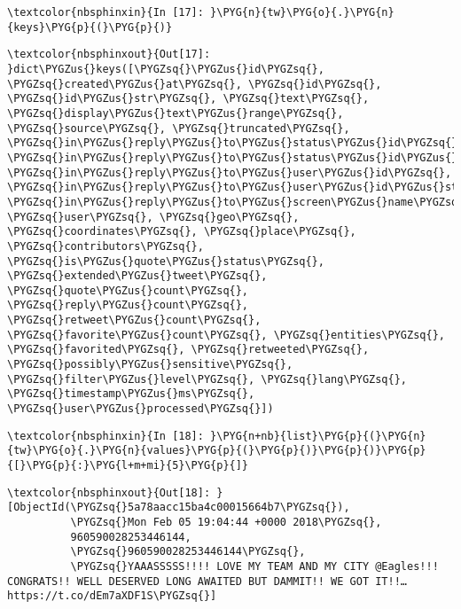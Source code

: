 \documentclass[letterpaper,10pt,english]{sphinxmanual}
\begin{document}
%
\begin{Verbatim}[commandchars=\\\{\}]
\textcolor{nbsphinxin}{In [17]: }\PYG{n}{tw}\PYG{o}{.}\PYG{n}{keys}\PYG{p}{(}\PYG{p}{)}
\end{Verbatim}

%
\begin{Verbatim}[commandchars=\\\{\}]
\textcolor{nbsphinxout}{Out[17]: }dict\PYGZus{}keys([\PYGZsq{}\PYGZus{}id\PYGZsq{}, \PYGZsq{}created\PYGZus{}at\PYGZsq{}, \PYGZsq{}id\PYGZsq{}, \PYGZsq{}id\PYGZus{}str\PYGZsq{}, \PYGZsq{}text\PYGZsq{}, \PYGZsq{}display\PYGZus{}text\PYGZus{}range\PYGZsq{}, \PYGZsq{}source\PYGZsq{}, \PYGZsq{}truncated\PYGZsq{}, \PYGZsq{}in\PYGZus{}reply\PYGZus{}to\PYGZus{}status\PYGZus{}id\PYGZsq{}, \PYGZsq{}in\PYGZus{}reply\PYGZus{}to\PYGZus{}status\PYGZus{}id\PYGZus{}str\PYGZsq{}, \PYGZsq{}in\PYGZus{}reply\PYGZus{}to\PYGZus{}user\PYGZus{}id\PYGZsq{}, \PYGZsq{}in\PYGZus{}reply\PYGZus{}to\PYGZus{}user\PYGZus{}id\PYGZus{}str\PYGZsq{}, \PYGZsq{}in\PYGZus{}reply\PYGZus{}to\PYGZus{}screen\PYGZus{}name\PYGZsq{}, \PYGZsq{}user\PYGZsq{}, \PYGZsq{}geo\PYGZsq{}, \PYGZsq{}coordinates\PYGZsq{}, \PYGZsq{}place\PYGZsq{}, \PYGZsq{}contributors\PYGZsq{}, \PYGZsq{}is\PYGZus{}quote\PYGZus{}status\PYGZsq{}, \PYGZsq{}extended\PYGZus{}tweet\PYGZsq{}, \PYGZsq{}quote\PYGZus{}count\PYGZsq{}, \PYGZsq{}reply\PYGZus{}count\PYGZsq{}, \PYGZsq{}retweet\PYGZus{}count\PYGZsq{}, \PYGZsq{}favorite\PYGZus{}count\PYGZsq{}, \PYGZsq{}entities\PYGZsq{}, \PYGZsq{}favorited\PYGZsq{}, \PYGZsq{}retweeted\PYGZsq{}, \PYGZsq{}possibly\PYGZus{}sensitive\PYGZsq{}, \PYGZsq{}filter\PYGZus{}level\PYGZsq{}, \PYGZsq{}lang\PYGZsq{}, \PYGZsq{}timestamp\PYGZus{}ms\PYGZsq{}, \PYGZsq{}user\PYGZus{}processed\PYGZsq{}])
\end{Verbatim}

%
\begin{Verbatim}[commandchars=\\\{\}]
\textcolor{nbsphinxin}{In [18]: }\PYG{n+nb}{list}\PYG{p}{(}\PYG{n}{tw}\PYG{o}{.}\PYG{n}{values}\PYG{p}{(}\PYG{p}{)}\PYG{p}{)}\PYG{p}{[}\PYG{p}{:}\PYG{l+m+mi}{5}\PYG{p}{]}
\end{Verbatim}

%
\begin{Verbatim}[commandchars=\\\{\}]
\textcolor{nbsphinxout}{Out[18]: }[ObjectId(\PYGZsq{}5a78aacc15ba4c00015664b7\PYGZsq{}),
          \PYGZsq{}Mon Feb 05 19:04:44 +0000 2018\PYGZsq{},
          960590028253446144,
          \PYGZsq{}960590028253446144\PYGZsq{},
          \PYGZsq{}YAAASSSSS!!!! LOVE MY TEAM AND MY CITY @Eagles!!! CONGRATS!! WELL DESERVED LONG AWAITED BUT DAMMIT!! WE GOT IT!!… https://t.co/dEm7aXDF1S\PYGZsq{}]
\end{Verbatim}
\end{document}

